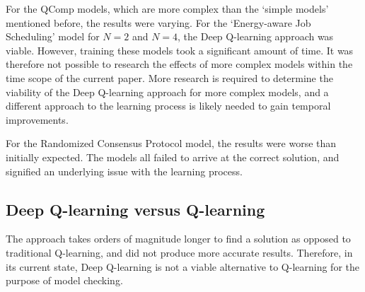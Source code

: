 For the QComp models, which are more complex than the `simple models' mentioned before, the results were varying. For the `Energy-aware Job Scheduling' model for $N = 2$ and $N = 4$, the Deep Q-learning approach was viable. However, training these models took a significant amount of time. It was therefore not possible to research the effects of more complex models within the time scope of the current paper. More research is required to determine the viability of the Deep Q-learning approach for more complex models, and a different approach to the learning process is likely needed to gain temporal improvements.

For the Randomized Consensus Protocol model, the results were worse than initially expected. The models all failed to arrive at the correct solution, and signified an underlying issue with the learning process.

\subsection{Deep Q-learning versus Q-learning}

The approach takes orders of magnitude longer to find a solution as opposed to traditional Q-learning, and did not produce more accurate results. Therefore, in its current state, Deep Q-learning is not a viable alternative to Q-learning for the purpose of model checking.